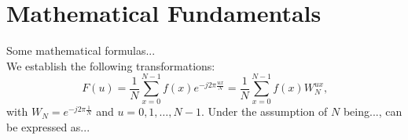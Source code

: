 \chapter{Mathematical Fundamentals}
\label{chap:mathFund}

Some mathematical formulas...\\
We establish the following transformations:
\begin{equation}
\label{eq:Fourier1}
F(u) = \frac{1}{N} \sum \limits_{x=0}^{N-1}f(x) e^{ -j 2 \pi \frac{u x}{N} }
  = \frac{1}{N} \sum \limits_{x=0}^{N-1}f(x) W_{N}^{ux}
\textrm{,}
\end{equation}
with $W_{N} = e^{ -j 2 \pi \frac{1}{N}} $ and $u=0,1,\dots,N-1$. Under the assumption of $N$ being...,  can be expressed as...
